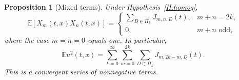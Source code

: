 \documentclass[12pt]{article}
\numberwithin{equation}{section}
\newtheorem{proposition}[theorem]{Proposition}
\theoremstyle{definition}
\newcommand{\E}{\mathbb{E}}
\begin{document}
\begin{proposition}[Mixed terms]\label{P:mixed}
  Under Hypothesis~\ref{H:homog},
  \begin{equation}\label{E:mixed-moment}
    \E[X_m(t,x)X_n(t,x)]
    =\begin{cases}
      \displaystyle\sum_{D\in\Pi_k}J_{m,n,D}(t),&m+n=2k,\\
      0,&m+n\text{ odd},
    \end{cases}
  \end{equation}
  where the case $m=n=0$ equals one. In particular,
  \begin{equation}\label{E:full-second}
    \E u^2(t,x)=\sum_{k=0}^\infty\sum_{m=0}^{2k}
    \sum_{D\in\Pi_k}J_{m,2k-m,D}(t).
  \end{equation}
  This is a convergent series of nonnegative terms.
\end{proposition}
\end{document}

